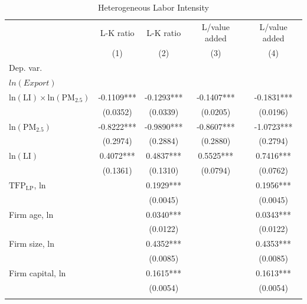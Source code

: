 \documentclass[12pt]{article}
\begin{document}
  \begin{table}[H]\centering 
    \footnotesize
    \caption{Heterogeneous Labor Intensity}\label{tab:hetero_LI}
    \begin{tabular}{l*{4}{c}}
      \hline\hline
      &\multicolumn{1}{c}{L-K ratio}&\multicolumn{1}{c}{L-K ratio}&\multicolumn{1}{c}{L/value added}&\multicolumn{1}{c}{L/value added}\\
      &\multicolumn{1}{c}{(1)}&\multicolumn{1}{c}{(2)}&\multicolumn{1}{c}{(3)}&\multicolumn{1}{c}{(4)}\\
      Dep. var. &&&&\\
      $ln(Export)$ &&&&\\
      \hline
      $\mathrm{ln(LI) \times ln(PM_{2.5})}$  &-0.1109***  &-0.1293***&-0.1407*** &-0.1831***\\
                                            &(0.0352)    &(0.0339)  &(0.0205)   &(0.0196)\\
      $\mathrm{ln(PM_{2.5})}$               &-0.8222***  &-0.9890***&-0.8607*** &-1.0723***\\
                                            &(0.2974)    &(0.2884)  &(0.2880)   &(0.2794)\\
      $\mathrm{ln(LI)}$                      &0.4072***   &0.4837*** &0.5525***  &0.7416***\\
                                             &(0.1361)    &(0.1310)  &(0.0794)   &(0.0762)\\
      $\mathrm{TFP_{LP}}$, ln                &            &0.1929*** &           &0.1956***\\
                                            &            &(0.0045)  &           &(0.0045) \\
      Firm age, ln                          &            &0.0340*** &           &0.0343***\\
                                            &            &(0.0122)  &           &(0.0122)\\
      Firm size, ln                         &            &0.4352*** &           &0.4353***\\
                                            &            &(0.0085)  &           &(0.0085)\\
      Firm capital, ln                      &            &0.1615*** &           &0.1613***\\ 
                                            &            &(0.0054)  &           &(0.0054)\\  
                                    &&&&\\

\end{tabular}
\end{table}
\end{document}
